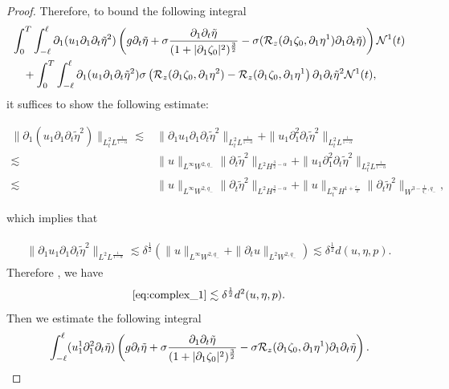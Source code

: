 \documentclass[letterpaper,reqno,10pt,twoside]{amsart}
\theoremstyle{definition}
\theoremstyle{remark}
\def\p{\partial}
\begin{document}
\begin{proof}
			\noindent Therefore, to bound the following integral
			\begin{align}{\label{eq:complex_1}}
				\begin{aligned}
					&\int_{0}^{T}\int_{-\ell}^{\ell}\p_{1}(u_{1}\p_{1}\p_{t}\tilde{\eta}^{2})\left (g\p_{t}\tilde{\eta}+\sigma\frac{\p_{1}\p_{t}\tilde{\eta}}{(1+\vert \p_{1}\zeta_{0}\vert^2)^{\frac{3}{2}}}-\sigma(\mathcal{R}_{z}(\p_{1}\zeta_{0},\p_{1}\eta^{1})\p_{1}\p_{t}\tilde{\eta})\right)\mathcal{N}^{1}(t)\\
					&\quad+\int_{0}^{T}\int_{-\ell}^{\ell}\p_{1}(u_{1}\p_{1}\p_{t}\tilde{\eta}^{2})\sigma\left(\mathcal{R}_{z}(\p_{1}\zeta_{0},\p_{1}\eta^{2})-\mathcal{R}_{z}(\p_{1}\zeta_{0},\p_{1}\eta^{1}\right)\p_{1}\p_{t}\tilde{\eta}^{2}\mathcal{N}^{1}(t),
				\end{aligned}
			\end{align}
			it suffices to show the following estimate:
			
			\[
			\begin{aligned}
				\|\p_{1}(u_{1}\p_{1}\p_{t}\tilde{\eta}^{2})\|_{L_{t}^{2}L^{\frac{1}{1-\alpha}}}\lesssim&\|\p_{1}u_{1}\p_{1}\p_{t}\tilde{\eta}^{2}\|_{L_{t}^{2}L^{\frac{1}{1-\alpha}}}+\|u_{1}\p_{1}^{2}\p_{t}\tilde{\eta}^{2}\|_{L_{t}^{2}L^{\frac{1}{1-\alpha}}}\\
				\lesssim&\|u\|_{L^{\infty}W^{2,q_{-}}}\|\p_{t}\tilde{\eta}^{2}\|_{L^{2}H^{\frac{3}{2}-\alpha}}+\|u_{1}
				\p_{1}^{2}\p_{t}\tilde{\eta}^{2}\|_{L_{t}^{2}L^{\frac{1}{1-\alpha}}}\\
				\lesssim& \|u\|_{L^{\infty}W^{2,q_{-}}}\|\p_{t}\tilde{\eta}^{2}\|_{L^{2}H^{\frac{3}{2}-\alpha}}+\|u\|_{L_{t}^{\infty}H^{1+\frac{\varepsilon_{-}}{2}}}\|
				\p_{t}\tilde{\eta}^{2}\|_{W^{3-\frac{1}{q_{-}},q_{-}}},
			\end{aligned}
			\]
			
			\noindent which implies that
			
			\begin{align}\label{est:bdd_1}
				\begin{aligned}
					\|\p_{1}u_{1}\p_{1}\p_{t}\tilde{\eta}^{2}\|_{L^{2}L^{\frac{1}{1-\alpha}}}\lesssim \delta^{\frac{1}{2}}(\|u\|_{L^{\infty}W^{2,q_{-}}}+\|\p_{t}u\|_{L^{2}W^{2,q_{-}}})\lesssim\delta^{\frac{1}{2}}d(u,\eta,p).
				\end{aligned}
			\end{align}
			\noindent Therefore , we have
			\[
			\eqref{eq:complex_1}\lesssim \delta^{\frac{1}{2}}d^{2}(u,\eta,p).
			\]
			\noindent Then we estimate the following integral
			\begin{align}{\label{eq:bdd_1}}
				\int_{-\ell}^{\ell}(u_{1}^{1}\p_{1}^{2}\p_{t}\tilde{\eta})\left(g\p_{t}\tilde{\eta}+\sigma\frac{\p_{1}\p_{t}\tilde{\eta}}{(1+\vert \p_{1}\zeta_{0}\vert^2)^{\frac{3}{2}}}-\sigma\mathcal{R}_{z}(\p_{1}\zeta_{0},\p_{1}\eta^{1})\p_{1}\p_{t}\tilde{\eta}\right).
			\end{align}
			

\end{proof}
\end{document}
